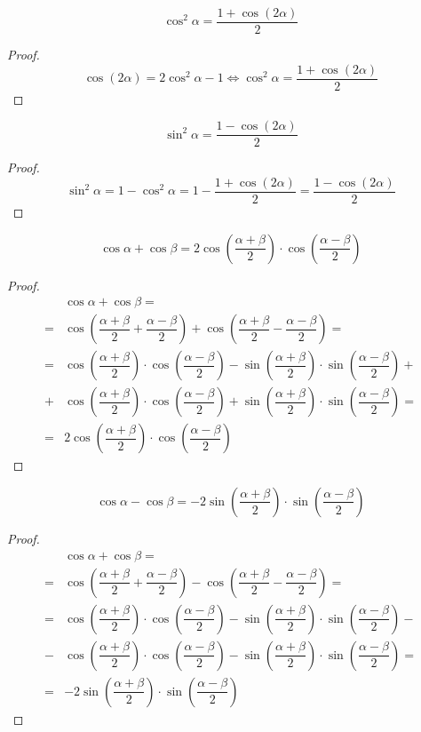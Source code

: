 \documentclass[12pt]{article}
\begin{document}
    \begin{statement}
        $$\cos^2\alpha=\dfrac{1+\cos(2\alpha)}{2}$$
    \end{statement}
    \begin{proof}
        $$\cos (2\alpha)=2\cos^2\alpha-1\Longleftrightarrow \cos^2\alpha=\dfrac{1+\cos(2\alpha)}{2}$$
    \end{proof}
    \begin{statement}
        $$\sin^2\alpha=\dfrac{1-\cos(2\alpha)}{2}$$
    \end{statement}
    \begin{proof}
        $$\sin^2\alpha=1-\cos^2\alpha=1-\dfrac{1+\cos(2\alpha)}{2}=\dfrac{1-\cos(2\alpha)}{2}$$
    \end{proof}
    \begin{statement}
        $$\cos\alpha+\cos\beta=2\cos\left(\dfrac{\alpha+\beta}{2}\right)\cdot\cos\left(\dfrac{\alpha-\beta}{2}\right)$$
    \end{statement}
    \begin{proof}
        \begin{align*}
            &\cos\alpha+\cos\beta=\\
            =&\cos\left(\dfrac{\alpha+\beta}{2}+\dfrac{\alpha-\beta}{2}\right)+\cos\left(\dfrac{\alpha+\beta}{2}-\dfrac{\alpha-\beta}{2}\right)=\\
            =&\cos\left(\dfrac{\alpha+\beta}{2}\right)\cdot\cos\left(\dfrac{\alpha-\beta}{2}\right)-\sin\left(\dfrac{\alpha+\beta}{2}\right)\cdot\sin\left(\dfrac{\alpha-\beta}{2}\right)+\\
            +&\cos\left(\dfrac{\alpha+\beta}{2}\right)\cdot\cos\left(\dfrac{\alpha-\beta}{2}\right)+\sin\left(\dfrac{\alpha+\beta}{2}\right)\cdot\sin\left(\dfrac{\alpha-\beta}{2}\right)=\\
            =&2\cos\left(\dfrac{\alpha+\beta}{2}\right)\cdot\cos\left(\dfrac{\alpha-\beta}{2}\right)
        \end{align*}
    \end{proof}
    \begin{statement}
        $$\cos\alpha-\cos\beta=-2\sin\left(\dfrac{\alpha+\beta}{2}\right)\cdot\sin\left(\dfrac{\alpha-\beta}{2}\right)$$
    \end{statement}
    \begin{proof}
        \begin{align*}
            &\cos\alpha+\cos\beta=\\
            =&\cos\left(\dfrac{\alpha+\beta}{2}+\dfrac{\alpha-\beta}{2}\right)-\cos\left(\dfrac{\alpha+\beta}{2}-\dfrac{\alpha-\beta}{2}\right)=\\
            =&\cos\left(\dfrac{\alpha+\beta}{2}\right)\cdot\cos\left(\dfrac{\alpha-\beta}{2}\right)-\sin\left(\dfrac{\alpha+\beta}{2}\right)\cdot\sin\left(\dfrac{\alpha-\beta}{2}\right)-\\
            -&\cos\left(\dfrac{\alpha+\beta}{2}\right)\cdot\cos\left(\dfrac{\alpha-\beta}{2}\right)-\sin\left(\dfrac{\alpha+\beta}{2}\right)\cdot\sin\left(\dfrac{\alpha-\beta}{2}\right)=\\
            =&-2\sin\left(\dfrac{\alpha+\beta}{2}\right)\cdot\sin\left(\dfrac{\alpha-\beta}{2}\right)
        \end{align*}
    \end{proof}
\end{document}
